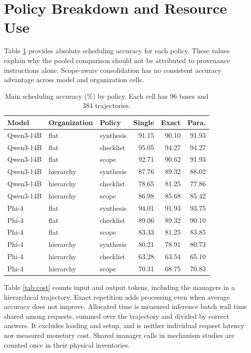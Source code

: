 \documentclass{svproc}
\begin{document}
\section{Policy Breakdown and Resource Use}
\label{app:policies}
Table \ref{tab:policies} provides absolute scheduling accuracy for each policy.
These values explain why the pooled comparison should not be attributed to
provenance instructions alone. Scope-aware consolidation has no consistent
accuracy advantage across model and organization cells.

\begin{table}[htbp]
\centering\small
\setlength{\tabcolsep}{4pt}
\caption{Main scheduling accuracy (\%) by policy. Each cell has 96 bases and 384 trajectories.}\label{tab:policies}
\begin{tabular}{lllrrr}\toprule
Model & Organization & Policy & Single & Exact & Para.\\\midrule
Qwen3-14B & flat & synthesis & 91.15 & 90.10 & 91.93\\
Qwen3-14B & flat & checklist & 95.05 & 94.27 & 94.27\\
Qwen3-14B & flat & scope & 92.71 & 90.62 & 91.93\\
Qwen3-14B & hierarchy & synthesis & 87.76 & 89.32 & 88.02\\
Qwen3-14B & hierarchy & checklist & 78.65 & 81.25 & 77.86\\
Qwen3-14B & hierarchy & scope & 86.98 & 85.68 & 85.42\\
Phi-4 & flat & synthesis & 94.01 & 91.93 & 93.75\\
Phi-4 & flat & checklist & 89.06 & 89.32 & 90.10\\
Phi-4 & flat & scope & 83.33 & 81.25 & 83.85\\
Phi-4 & hierarchy & synthesis & 80.21 & 78.91 & 80.73\\
Phi-4 & hierarchy & checklist & 63.28 & 63.54 & 65.10\\
Phi-4 & hierarchy & scope & 70.31 & 68.75 & 70.83\\
\bottomrule\end{tabular}
\end{table}

Table \ref{tab:cost} counts input and output tokens, including the managers in a
hierarchical trajectory. Exact repetition adds processing even when average
accuracy does not improve. Allocated time is measured inference batch wall time
shared among requests, summed over the trajectory and divided by correct
answers. It excludes loading and setup, and is neither individual request
latency nor measured monetary cost. Shared manager calls in mechanism studies
are counted once in their physical inventories.
\end{document}

